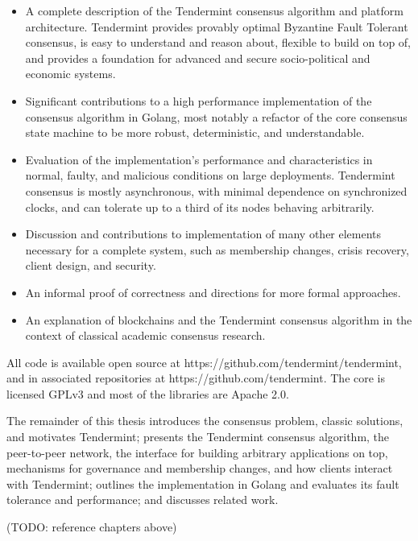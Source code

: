 \begin{itemize}  

    \item A complete description of the Tendermint consensus algorithm and platform architecture. Tendermint provides provably optimal Byzantine Fault Tolerant consensus, is easy to understand and reason about, flexible to build on top of, and provides a foundation for advanced and secure socio-political and economic systems. 

    \item Significant contributions to a high performance implementation of the consensus algorithm in Golang, most notably a refactor of the core consensus state machine to be more robust, deterministic, and understandable.

    \item Evaluation of the implementation's performance and characteristics in normal, faulty, and malicious conditions on large deployments. Tendermint consensus is mostly asynchronous, with minimal dependence on synchronized clocks, and can tolerate up to a third of its nodes behaving arbitrarily. 

    \item Discussion and contributions to implementation of many other elements necessary for a complete system, such as membership changes, crisis recovery, client design, and security.

    \item An informal proof of correctness and directions for more formal approaches.

    \item An explanation of blockchains and the Tendermint consensus algorithm in the context of classical academic consensus research.
\end{itemize}

All code is available open source at https://github.com/tendermint/tendermint, and in associated repositories at https://github.com/tendermint. 
The core is licensed GPLv3 and most of the libraries are Apache 2.0.

The remainder of this thesis introduces the consensus problem, classic solutions, and motivates Tendermint;
presents the Tendermint consensus algorithm, the peer-to-peer network, the interface for building arbitrary applications on top,  
mechanisms for governance and membership changes, and how clients interact with Tendermint;
outlines the implementation in Golang and evaluates its fault tolerance and performance;
and discusses related work.

(TODO: reference chapters above)
